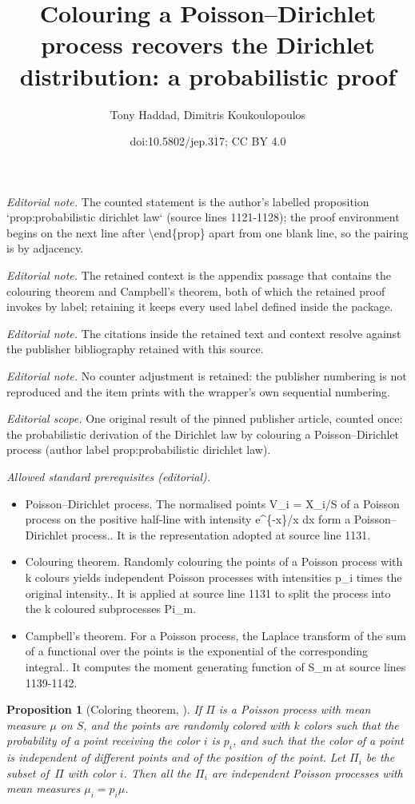 \documentclass[10pt,a4paper]{article}
\title{Colouring a Poisson--Dirichlet process recovers the Dirichlet distribution: a probabilistic proof}
\author{Tony Haddad, Dimitris Koukoulopoulos}
\date{doi:10.5802/jep.317; CC BY 4.0}
\theoremstyle{plain}
\newtheorem{prop}[cor]{Proposition}
\theoremstyle{definition}
\begin{document}
\maketitle
\noindent\textit{Editorial note.} The counted statement is the author's labelled proposition `prop:probabilistic dirichlet law` (source lines 1121-1128); the proof environment begins on the next line after \textbackslash{}end\{prop\} apart from one blank line, so the pairing is by adjacency.\par\medskip
\noindent\textit{Editorial note.} The retained context is the appendix passage that contains the colouring theorem and Campbell's theorem, both of which the retained proof invokes by label; retaining it keeps every used label defined inside the package.\par\medskip
\noindent\textit{Editorial note.} The citations inside the retained text and context resolve against the publisher bibliography retained with this source.\par\medskip
\noindent\textit{Editorial note.} No counter adjustment is retained: the publisher numbering is not reproduced and the item prints with the wrapper's own sequential numbering.\par\medskip
\noindent\textit{Editorial scope.} One original result of the pinned publisher article, counted once: the probabilistic derivation of the Dirichlet law by colouring a Poisson--Dirichlet process (author label prop:probabilistic dirichlet law).\par\medskip
\noindent\textit{Allowed standard prerequisites (editorial).}\begin{itemize}
\item Poisson--Dirichlet process. The normalised points V\_i = X\_i/S of a Poisson process on the positive half-line with intensity e\textasciicircum{}\{-x\}/x dx form a Poisson--Dirichlet process.. It is the representation adopted at source line 1131.
\item Colouring theorem. Randomly colouring the points of a Poisson process with k colours yields independent Poisson processes with intensities p\_i times the original intensity.. It is applied at source line 1131 to split the process into the k coloured subprocesses Pi\_m.
\item Campbell's theorem. For a Poisson process, the Laplace transform of the sum of a functional over the points is the exponential of the corresponding integral.. It computes the moment generating function of S\_m at source lines 1139-1142.
\end{itemize}\medskip
\begin{prop}[Coloring theorem, {\cite[\S5.1]{Kingman93}}]
\label{prel:color}
If $\Pi$ is a Poisson process with mean measure $\mu$ on $S$, and the points are randomly colored with $k$ colors such that the probability of a point receiving the color $i$ is $p_i$, and such that the color of a point is independent of different points and of the position of the point. Let $\Pi_i$ be the subset of~$\Pi$ with color $i$. Then all the $\Pi_i$ are independent Poisson processes with mean measures $\mu_i = p_i\mu$.
\end{prop}
\end{document}
